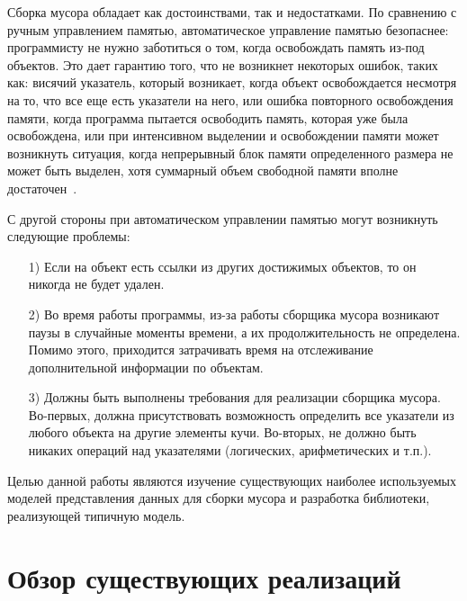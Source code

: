 \documentclass[12pt,a4paper]{article}
\begin{document}
Сборка мусора обладает как достоинствами, так и недостатками.
По сравнению с ручным управлением памятью, автоматическое управление памятью безопаснее: программисту не нужно 
заботиться о том, когда освобождать память из-под объектов. 
Это дает гарантию того, что не возникнет некоторых ошибок, таких как:
висячий указатель, который возникает, когда объект освобождается несмотря на то, 
что все еще есть
указатели на него, или ошибка повторного освобождения памяти, 
когда программа пытается освободить память, которая уже  была освобождена, 
или при интенсивном выделении и освобождении памяти может возникнуть ситуация,
когда непрерывный блок памяти определенного размера не может быть выделен,
хотя суммарный объем свободной памяти вполне достаточен~\cite{gc1}.

С другой стороны при автоматическом управлении памятью могут возникнуть следующие проблемы:
\begin{enumerate}
\item[1)] Если на объект есть ссылки из других достижимых объектов, то он никогда не будет удален.
\item[2)] Во время работы программы, из-за работы сборщика мусора возникают паузы в случайные моменты времени, а их продолжительность не определена.
Помимо этого, приходится затрачивать время на отслеживание дополнительной информации по объектам.
\item[3)] Должны быть выполнены  требования для реализации сборщика мусора.
Во-первых, должна присутствовать возможность определить все указатели из любого объекта на другие элементы кучи.
Во-вторых, не должно быть никаких операций над указателями (логических, арифметических и т.п.).
\end{enumerate}
Целью данной работы являются изучение существующих наиболее используемых моделей представления данных для сборки мусора и
разработка библиотеки, реализующей типичную модель.

\newpage
\section{Обзор существующих реализаций}
\end{document}
